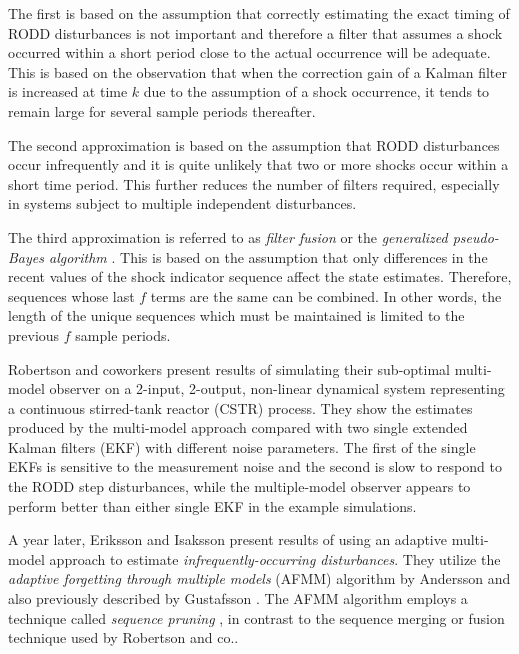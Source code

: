 The first is based on the assumption that correctly estimating the exact timing of RODD disturbances is not important and therefore a filter that assumes a shock occurred within a short period close to the actual occurrence will be adequate. This is based on the observation that when the correction gain of a Kalman filter is increased at time $k$ due to the assumption of a shock occurrence, it tends to remain large for several sample periods thereafter.

The second approximation is based on the assumption that RODD disturbances occur infrequently and it is quite unlikely that two or more shocks occur within a short time period. This further reduces the number of filters required, especially in systems subject to multiple independent disturbances.

The third approximation is referred to as \textit{filter fusion} or the \textit{generalized pseudo-Bayes algorithm} \cite{jaffer_estimation_1971, buxbaum_recursive_1970, tugnait_detection_1982}. This is based on the assumption that only differences in the recent values of the shock indicator sequence affect the state estimates. Therefore, sequences whose last $f$ terms are the same can be combined. In other words, the length of the unique sequences which must be maintained is limited to the previous $f$ sample periods.

Robertson and coworkers present results of simulating their sub-optimal multi-model observer on a 2-input, 2-output, non-linear dynamical system representing a continuous stirred-tank reactor (CSTR) process. They show the estimates produced by the multi-model approach compared with two single extended Kalman filters (EKF) with different noise parameters. The first of the single EKFs is sensitive to the measurement noise and the second is slow to respond to the RODD step disturbances, while the multiple-model observer appears to perform better than either single EKF in the example simulations.

A year later, Eriksson and Isaksson \cite{eriksson_classification_1996} present results of using an adaptive multi-model approach to estimate \textit{infrequently-occurring disturbances}. They utilize the \textit{adaptive forgetting through multiple models} (AFMM) algorithm by Andersson \cite{andersson_adaptive_1985} and also previously described by Gustafsson \cite{gustafsson_estimation_1993}. The AFMM algorithm employs a technique called \textit{sequence pruning} \cite{tugnait_detection_1982}, in contrast to the sequence merging or fusion technique used by Robertson and co.\cite{blom_interacting_1988}.

